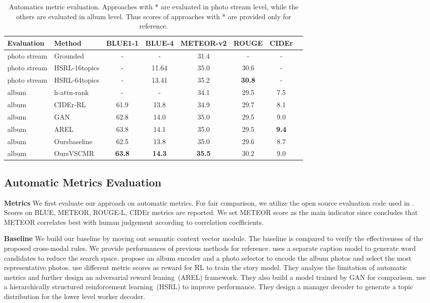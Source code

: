 \documentclass[sigconf]{acmart}
\begin{document}
\begin{table*}[t]
\centering
\caption{Automatics metric evaluation. Approaches with * are evaluated in photo stream level, while the others are evaluated in album level. Thus scores of approaches with * are provided only for reference.}
\begin{tabular}{llcccccc}
\toprule
Evaluation&Method&BLUE1-1&BLUE-4&METEOR-v2&ROUGE&CIDEr\\
\midrule
photo stream&Grounded\cite{huang2016visual}&-&-&31.4&-&-\\
photo stream&HSRL-16topics\cite{Huang18}&-&11.64&35.0&30.6&-\\
photo stream&HSRL-64topics\cite{Huang18}&-&13.41&35.2&\textbf{30.8}&-\\
album&h-attn-rank\cite{yu2017hierarchically}&-&-&34.1&29.5&7.5\\
album&CIDEr-RL\cite{wang2018no}&61.9&13.8&34.9&29.7&8.1\\
album&GAN\cite{wang2018no}&62.8&14.0&35.0&29.5&9.0\\
album&AREL\cite{wang2018no}&63.8&14.1&35.0&29.5&\textbf{9.4}\\
\midrule
album&Oursbaseline&62.5&13.8&35.0&29.6&8.7\\
album&OursVSCMR&\textbf{63.8}&\textbf{14.3}&\textbf{35.5}&30.2&9.0\\
\bottomrule
\end{tabular}
\setlength{\belowcaptionskip}{10pt}
\label{table2}
\end{table*}

\subsection{Automatic Metrics Evaluation}
\textbf{Metrics} We first evaluate our approach on automatic metrics. For fair comparison, we utilize the open source evaluation code used in \cite{yu2017hierarchically} \cite{wang2018no}. Scores on BLUE\cite{Papineni02}, METEOR\cite{SATANJEEV05}, ROUGE-L\cite{Lin04}, CIDEr\cite{vedantam2015cider} metrics are reported. We set METEOR score as the main indicator since \cite{huang2016visual} concludes that METEOR correlates best with human judgement according to correlation coefficients.

\textbf{Baseline} We build our baseline by moving out semantic context vector module. The baseline is compared to verify the effectiveness of the proposed cross-modal rules. We provide performances of previous methods for reference. \cite{huang2016visual} uses a separate caption model to generate word candidates to reduce the search space. \cite{yu2017hierarchically} propose an album encoder and a photo selector to encode the album photos and select the most representative photos. \cite{wang2018no} use different metric scores as reward for RL to train the story model. They analyse the limitation of automatic metrics and further design an adversarial reward leaning~(AREL) framework. They also build a model trained by GAN for comparison. \cite{Huang18} use a hierarchically structured reinforcement learning~(HSRL) to improve performance. They design a manager decoder to generate a topic distribution for the lower level worker decoder. 
\end{document}
